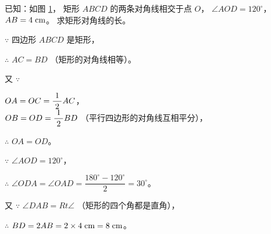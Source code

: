 \begin{enhancedline}
\liti[0] 已知：如图 \ref{fig:czjh1-4-23}， 矩形 $ABCD$ 的两条对角线相交于点 $O$， $\angle AOD = 120^\circ$，
$AB = 4\;\mathord{\text{cm}}$。 求矩形对角线的长。

\begin{figure}
    \centering
    
    \caption{}\label{fig:czjh1-4-23}
\end{figure}


\jie $\because$ \quad 四边形 $ABCD$ 是矩形，

$\therefore$ \quad $AC = BD$ （矩形的对角线相等）。

又 $\because$ \quad \begin{zmtblr}[t]{}
    $OA = OC = \dfrac{\; 1 \;}{2} AC$， \\[1em]
    $OB = OD = \dfrac{\; 1 \;}{2} BD$ （平行四边形的对角线互相平分），
\end{zmtblr}

$\therefore$ \quad $OA = OD$。

$\because$ \quad $\angle AOD = 120^\circ$，

$\therefore$ \quad $\angle ODA = \angle OAD = \dfrac{180^\circ - 120^\circ}{2} = 30^\circ$。

又 $\because$ \quad $\angle DAB = Rt \angle$ （矩形的四个角都是直角），

$\therefore$ \quad $BD = 2 AB = 2 \times 4 \;\mathord{\text{cm}} = 8\;\mathord{\text{cm}}$。
\end{enhancedline}


\begin{lianxi}





\end{lianxi}

